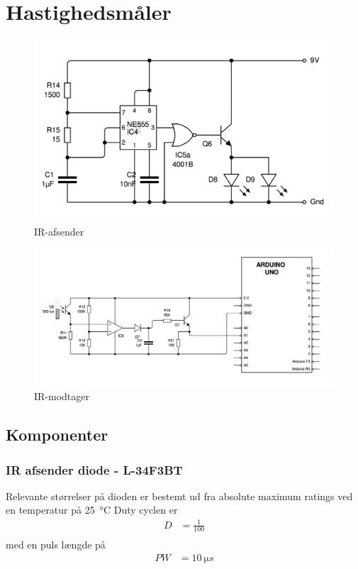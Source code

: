 \section{Hastighedsmåler}
\begin{figure}[H]
	\centering
    \includegraphics[width=13cm]{figures/CIRCUITS/IRafsenderFinal.png}
	\caption{IR-afsender}
	\label{fig:IRafsender}
\end{figure}
\begin{figure}[H]
	\centering
    \includegraphics[width=17cm]{figures/CIRCUITS/IRmodtagerFinal.png}
	\caption{IR-modtager}
	\label{fig:IRmodtager}
\end{figure}


\subsection{Komponenter}
\subsubsection{IR afsender diode - L-34F3BT}

Relevante størrelser på dioden \cite{kompIRafsender} er bestemt ud fra absolute maximum ratings ved en temperatur på \SI{25}{\celsius} 
Duty cyclen er
\begin{align}
	D &= \frac{1}{100} \\
\end{align}
med en puls længde på 
\begin{align}
	PW &= \SI{10}{\micro s} \\
\end{align}


